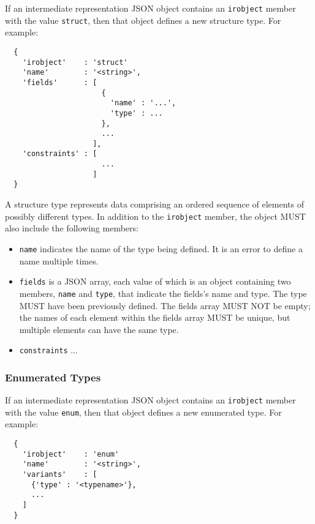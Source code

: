\documentclass[twocolumn,a4paper]{article}
\begin{document}
If an intermediate representation JSON object contains an \texttt{irobject}
member with the value \texttt{struct}, then that object defines a new
structure type. For example:

\begin{verbatim}
  {
    'irobject'    : 'struct'
    'name'        : '<string>',
    'fields'      : [
                      {
                        'name' : '...',
                        'type' : ...
                      },
                      ...
                    ],
    'constraints' : [
                      ...
                    ]
  }
\end{verbatim}

A structure type represents data comprising an ordered sequence of elements
of possibly different types. In addition to the \texttt{irobject} member, 
the object MUST also include the following members:
\begin{itemize}
  \item \texttt{name} indicates the name of the type being defined. It is
    an error to define a name multiple times.
  \item \texttt{fields} is a JSON array, each value of which is an object
    containing two members, \texttt{name} and \texttt{type}, that indicate
    the fields's name and type. The type MUST have been previously defined.
    The fields array MUST NOT be empty; the names of each element within
    the fields array MUST be unique, but multiple elements can have the
    same type.
  \item \texttt{constraints} ...
\end{itemize}

\subsubsection{Enumerated Types}

If an intermediate representation JSON object contains an \texttt{irobject}
member with the value \texttt{enum}, then that object defines a new enumerated
type. For example:

\begin{verbatim}
  {
    'irobject'    : 'enum'
    'name'        : '<string>',
    'variants'    : [
      {'type' : '<typename>'},
      ...
    ]
  }
\end{verbatim}
\end{document}
